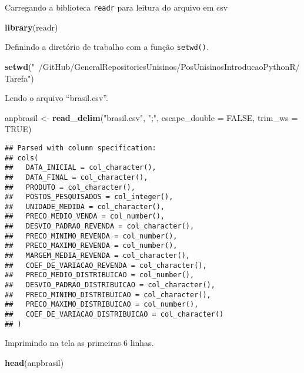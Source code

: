 \documentclass[]{article}
\newenvironment{Shaded}{\begin{snugshade}}{\end{snugshade}}
\newcommand{\KeywordTok}[1]{\textcolor[rgb]{0.13,0.29,0.53}{\textbf{#1}}}
\newcommand{\DataTypeTok}[1]{\textcolor[rgb]{0.13,0.29,0.53}{#1}}
\newcommand{\StringTok}[1]{\textcolor[rgb]{0.31,0.60,0.02}{#1}}
\newcommand{\OtherTok}[1]{\textcolor[rgb]{0.56,0.35,0.01}{#1}}
\newcommand{\NormalTok}[1]{#1}
\begin{document}
Carregando a biblioteca \texttt{readr} para leitura do arquivo em csv

\begin{Shaded}
\begin{Highlighting}[]
\KeywordTok{library}\NormalTok{(readr)}
\end{Highlighting}
\end{Shaded}

Definindo a diretório de trabalho com a função \texttt{setwd()}.

\begin{Shaded}
\begin{Highlighting}[]
\KeywordTok{setwd}\NormalTok{(}\StringTok{"~/GitHub/GeneralRepositoriesUnisinos/PosUnisinosIntroducaoPythonR/Tarefa"}\NormalTok{)}
\end{Highlighting}
\end{Shaded}

Lendo o arquivo ``brasil.csv''.

\begin{Shaded}
\begin{Highlighting}[]
\NormalTok{anpbrasil <-}\StringTok{ }\KeywordTok{read_delim}\NormalTok{(}\StringTok{"brasil.csv"}\NormalTok{, }\StringTok{";"}\NormalTok{, }\DataTypeTok{escape_double =} \OtherTok{FALSE}\NormalTok{, }\DataTypeTok{trim_ws =} \OtherTok{TRUE}\NormalTok{)}
\end{Highlighting}
\end{Shaded}

\begin{verbatim}
## Parsed with column specification:
## cols(
##   DATA_INICIAL = col_character(),
##   DATA_FINAL = col_character(),
##   PRODUTO = col_character(),
##   POSTOS_PESQUISADOS = col_integer(),
##   UNIDADE_MEDIDA = col_character(),
##   PRECO_MEDIO_VENDA = col_number(),
##   DESVIO_PADRAO_REVENDA = col_character(),
##   PRECO_MINIMO_REVENDA = col_number(),
##   PRECO_MAXIMO_REVENDA = col_number(),
##   MARGEM_MEDIA_REVENDA = col_character(),
##   COEF_DE_VARIACAO_REVENDA = col_character(),
##   PRECO_MEDIO_DISTRIBUICAO = col_number(),
##   DESVIO_PADRAO_DISTRIBUICAO = col_character(),
##   PRECO_MINIMO_DISTRIBUICAO = col_character(),
##   PRECO_MAXIMO_DISTRIBUICAO = col_number(),
##   COEF_DE_VARIACAO_DISTRIBUICAO = col_character()
## )
\end{verbatim}

Imprimindo na tela as primeiras 6 linhas.

\begin{Shaded}
\begin{Highlighting}[]
\KeywordTok{head}\NormalTok{(anpbrasil)}
\end{Highlighting}
\end{Shaded}
\end{document}
